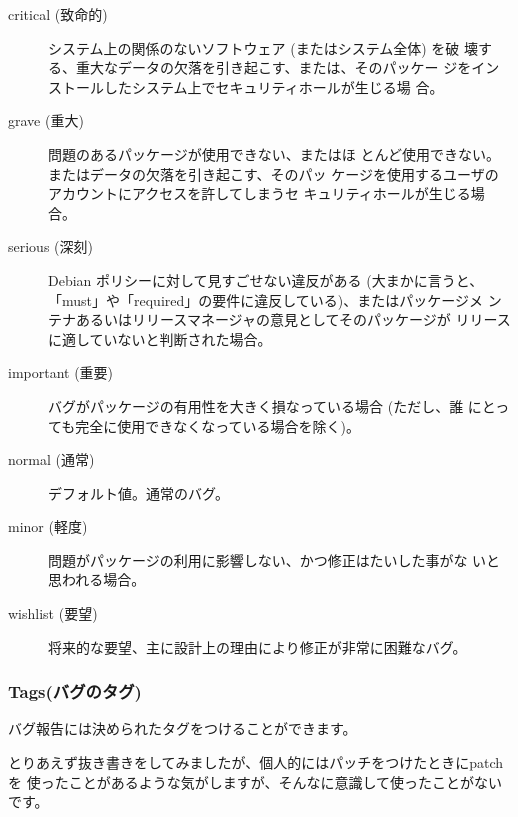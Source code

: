 \documentclass[mingoth,a4paper]{jsarticle}
\begin{document}
\begin{description}
 \item[critical (致命的)]

            システム上の関係のないソフトウェア (またはシステム全体) を破
            壊する、重大なデータの欠落を引き起こす、または、そのパッケー
            ジをインストールしたシステム上でセキュリティホールが生じる場
            合。

 \item[grave (重大)]

            問題のあるパッケージが使用できない、またはほ
            とんど使用できない。またはデータの欠落を引き起こす、そのパッ
            ケージを使用するユーザのアカウントにアクセスを許してしまうセ
            キュリティホールが生じる場合。

 \item[serious (深刻)]

            Debian ポリシーに対して見すごせない違反がある (大まかに言うと、
            「must」や「required」の要件に違反している)、またはパッケージメ
            ンテナあるいはリリースマネージャの意見としてそのパッケージが
            リリースに適していないと判断された場合。

 \item[important (重要)]

            バグがパッケージの有用性を大きく損なっている場合 (ただし、誰
            にとっても完全に使用できなくなっている場合を除く)。

 \item[normal (通常)]
            デフォルト値。通常のバグ。

 \item[minor (軽度)]

            問題がパッケージの利用に影響しない、かつ修正はたいした事がな
            いと思われる場合。

 \item[wishlist (要望)]

            将来的な要望、主に設計上の理由により修正が非常に困難なバグ。
\end{description}


\subsubsection{Tags(バグのタグ)}
バグ報告には決められたタグをつけることができます。

とりあえず抜き書きをしてみましたが、個人的にはパッチをつけたときにpatchを
使ったことがあるような気がしますが、そんなに意識して使ったことがないです。
\end{document}
